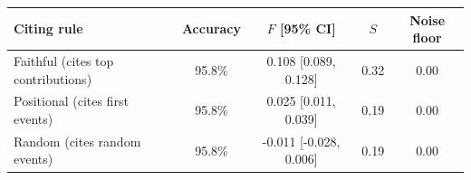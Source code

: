 \begin{tabular}{lcccc}
\toprule
Citing rule & Accuracy & $F$ [95\% CI] & $S$ & Noise floor \\
\midrule
Faithful (cites top contributions) & 95.8\% & 0.108 [0.089, 0.128] & 0.32 & 0.00 \\
Positional (cites first events) & 95.8\% & 0.025 [0.011, 0.039] & 0.19 & 0.00 \\
Random (cites random events) & 95.8\% & -0.011 [-0.028, 0.006] & 0.19 & 0.00 \\
\bottomrule
\end{tabular}
